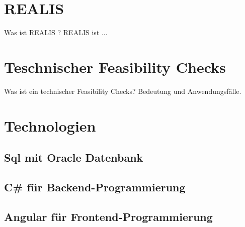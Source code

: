 \section{REALIS}\label{Sec:REALIS}

Was ist \ac{REALIS} ? \ac{REALIS} ist ...

\section{Teschnischer Feasibility Checks}
Was ist ein technischer Feasibility Checks? Bedeutung und Anwendungsfälle.

\section{Technologien}

\subsection{Sql mit Oracle Datenbank}

\subsection{C\# für Backend-Programmierung}

\subsection{Angular für Frontend-Programmierung}